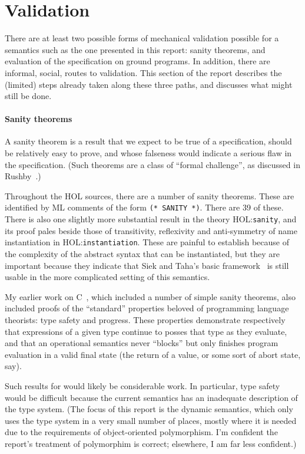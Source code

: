 \documentclass[11pt]{article}
\newcommand{\HOLfile}[1]{HOL:\texttt{#1}}
\begin{document}


\section{Validation}
\label{sec:validation}

There are at least two possible forms of mechanical validation
possible for a semantics such as the one presented in this report:
sanity theorems, and evaluation of the specification on ground
programs.  In addition, there are informal, social, routes to
validation.  This section of the report describes the (limited) steps
already taken along these three paths, and discusses what might still
be done.

\paragraph{Sanity theorems}
 A sanity theorem is a result that we expect to
be true of a specification, should be relatively easy to prove, and
whose falseness would indicate a serious flaw in the specification.
(Such theorems are a class of ``formal challenge'', as discussed in
Rushby~\cite{Rushby93}.)

Throughout the HOL sources, there are a number of sanity theorems.
These are identified by ML comments of the form \texttt{(*~SANITY~*)}.
There are 39 of these.  There is also one slightly more substantial
result in the theory \HOLfile{sanity}, and its proof pales beside
those of transitivity, reflexivity and anti-symmetry of name
instantiation in \HOLfile{instantiation}.  These are painful to
establish because of the complexity of the abstract syntax that can be
instantiated, but they are important because they indicate that Siek
and Taha's basic framework~\cite{DBLP:conf/ecoop/SiekT06} is still
usable in the more complicated setting of this \cpp{} semantics.

My earlier work on C~\cite{Norrish98}, which included a number of
simple sanity theorems, also included proofs of the ``standard''
properties beloved of programming language theorists: type safety and
progress.  These properties demonstrate respectively that expressions
of a given type continue to posses that type as they evaluate, and
that an operational semantics never ``blocks'' but only finishes
program evaluation in a valid final state (the return of a value, or
some sort of abort state, say).

Such results for \cpp{} would likely be considerable work.  In
particular, type safety would be difficult because the current
semantics has an inadequate description of the type system. (The focus
of this report is the dynamic semantics, which only uses the type
system in a very small number of places, mostly where it is needed due
to the requirements of object-oriented polymorphism.  I'm confident
the report's treatment of polymorphim is correct; elsewhere, I am far
less confident.)
\end{document}
